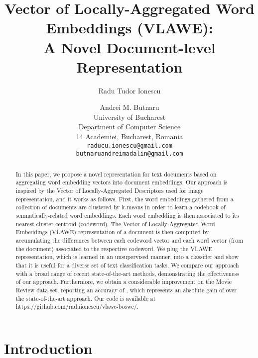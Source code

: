 \documentclass[11pt,a4paper]{article}
\title{Vector of Locally-Aggregated Word Embeddings (VLAWE):\\
A Novel Document-level Representation}
\author{{Radu Tudor} Ionescu \and Andrei M. Butnaru\\
  University of Bucharest\\
  Department of Computer Science\\
  14 Academiei, Bucharest, Romania\\
  {\tt raducu.ionescu@gmail.com}\\
  {\tt butnaruandreimadalin@gmail.com}
}
\date{}
\begin{document}
\maketitle
\begin{abstract}
In this paper, we propose a novel representation for text documents based on aggregating word embedding vectors into document embeddings. Our approach is inspired by the Vector of Locally-Aggregated Descriptors used for image representation, and it works as follows. First, the word embeddings gathered from a collection of documents are clustered by k-means in order to learn a codebook of semnatically-related word embeddings. Each word embedding is then associated to its nearest cluster centroid (codeword). The Vector of Locally-Aggregated Word Embeddings (VLAWE) representation of a document is then computed by accumulating the differences between each codeword vector and each word vector (from the document) associated to the respective codeword. We plug the VLAWE representation, which is learned in an unsupervised manner, into a classifier and show that it is useful for a diverse set of text classification tasks. We compare our approach with a broad range of recent state-of-the-art methods, demonstrating the effectiveness of our approach. Furthermore, we obtain a considerable improvement on the Movie Review data set, reporting an accuracy of , which represents an absolute gain of  over the state-of-the-art approach. Our code is available at https://github.com/raduionescu/vlawe-boswe/.
\end{abstract}

\setlength{\abovedisplayskip}{4pt}
\setlength{\belowdisplayskip}{4pt}

\section{Introduction}
\vspace*{-0.1cm}
\end{document}

